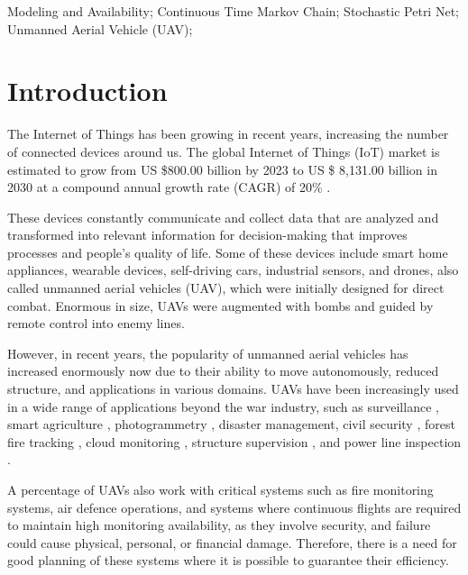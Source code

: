 \documentclass[conference]{IEEEtran}
\begin{document}
\begin{IEEEkeywords}
Modeling and Availability; Continuous Time Markov Chain; Stochastic Petri Net; Unmanned Aerial Vehicle (UAV);
\end{IEEEkeywords}

\section{Introduction}\label{sec:introduction}

The Internet of Things has been growing in recent years, increasing the number of connected devices around us. The global Internet of Things (IoT) market is estimated to grow from US \$800.00 billion by 2023 to US \$ 8,131.00 billion in 2030 at a compound annual growth rate (CAGR) of 20\% \citep{al2020internet}.

These devices constantly communicate and collect data that are analyzed and transformed into relevant information for decision-making that improves processes and people's quality of life. Some of these devices include smart home appliances, wearable devices, self-driving cars, industrial sensors, and drones, also called unmanned aerial vehicles (UAV), which were initially designed for direct combat. Enormous in size, UAVs were augmented with bombs and guided by remote control into enemy lines.

However, in recent years, the popularity of unmanned aerial vehicles has increased enormously now due to their ability to move autonomously, reduced structure, and applications in various domains. UAVs have been increasingly used in a wide range of applications beyond the war industry, such as surveillance \citep{basilico2015deploying}, smart agriculture \citep{lottes2017uav}, photogrammetry \citep{cesetti2011visual}, disaster management, civil security \citep {maza2011experimental}, forest fire tracking \citep{pham2017distributed}, cloud monitoring \citep{renzaglia2016monitoring}, structure supervision \citep{guerrero2013uav}, and power line inspection \citep{chang2017development}.

A percentage of UAVs also work with critical systems such as fire monitoring systems, air defence operations, and systems where continuous flights are required to maintain high monitoring availability, as they involve security, and failure could cause physical, personal, or financial damage. Therefore, there is a need for good planning of these systems where it is possible to guarantee their efficiency.

\end{document}
